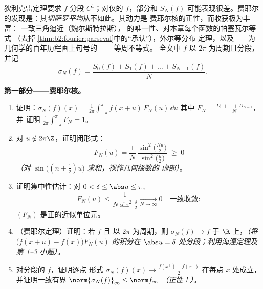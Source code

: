 \begin{problem}\label{pb:b2:fourier:1}
狄利克雷定理要求 $f$ 分段 $C^1$；对仅的
$f$，部分和 $S_N(f)$ 可能表现很差。费耶尔
的发现是：其\emph{切萨罗平均}从不如此。其动力是
费耶尔核的正性，而收获极为丰富：
一致三角逼近（魏尔斯特拉斯），
的唯一性、对本章每个函数的帕塞瓦尔等式
（去掉
\cref{thm:b2:fourier:parseval}中的“承认”），外尔等分布
定理，以及——为几何学的百年历程画上句号的——
等周不等式。
全文中 $f$ 以 $2\pi$ 为周期且分段，
并记
\[
\sigma_N(f) = \frac{S_0(f) + S_1(f) + \dots +
S_{N-1}(f)}{N} .
\]

\medskip
\noindent\textbf{第一部分——费耶尔核。}
\begin{enumerate}
  \item 证明：$\sigma_N(f)(x) =
        \frac{1}{2\pi}\int_{-\pi}^{\pi}f(x+u)\,F_N(u)\,\dd u$
        其中 $F_N = \frac{D_0 + \dots + D_{N-1}}{N}$，并
        证明 $\frac{1}{2\pi}\int_{-\pi}^{\pi}F_N = 1$。
  \item 对 $u \notin 2\pi\Z$，证明闭形式：
        \[
        F_N(u) = \frac{1}{N}\,
        \frac{\sin^2\bigl(\frac{Nu}{2}\bigr)}
        {\sin^2\bigl(\frac u2\bigr)} \;\geq\; 0
        \]
        \emph{（对 $\sin\bigl((n+\frac12)u\bigr)$ 求和，视作几何级数的
        虚部）}。
  \item 证明集中性估计：对 $0 < \delta \leq
        \abs u \leq \pi$,
        \[
        F_N(u) \leq \frac{1}{N\sin^2\frac\delta2}
        \xrightarrow[N\to\infty]{} 0
        \quad\text{一致收敛} :
        \]
        $(F_N)$ 是正的近似单位元。
  \item （费耶尔定理）证明：若 $f$ 且
        以 $2\pi$ 为周期，则 $\sigma_N(f) \to f$
        \emph{}于 $\R$ 上，\emph{（将
        $\bigl(f(x+u) - f(x)\bigr)F_N(u)$ 的积分在 $\abs u =
        \delta$ 处分段；利用海涅定理及第 1--3 小题）}。
  \item 对分段的 $f$，证明逐点
        形式 $\sigma_N(f)(x) \to \frac{f(x^+) +
        f(x^-)}{2}$ 在每点 $x$ 处成立，并证明一致有界
        $\norm{\sigma_N(f)}_\infty \leq \norm f_\infty$
        \emph{（正性！）}。
\end{enumerate}


\end{problem}
